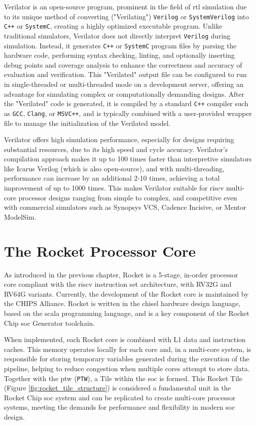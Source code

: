 Verilator is an open-source program, prominent in the field of \acrshort{rtl} simulation due to its unique method of converting ("Verilating") \texttt{Verilog} or \texttt{SystemVerilog} into \texttt{C++} or \texttt{SystemC}, creating a highly optimized executable program. Unlike traditional simulators, Verilator does not directly interpret \texttt{Verilog} during simulation. Instead, it generates \texttt{C++} or \texttt{SystemC} program files by parsing the hardware code, performing syntax checking, linting, and optionally inserting debug points and coverage analysis to enhance the correctness and accuracy of evaluation and verification. This "Verilated" output file can be configured to run in single-threaded or multi-threaded mode on a development server, offering an advantage for simulating complex or computationally demanding designs. After the "Verilated" code is generated, it is compiled by a standard \texttt{C++} compiler such as \texttt{GCC}, \texttt{Clang}, or \texttt{MSVC++}, and is typically combined with a user-provided wrapper file to manage the initialization of the Verilated model.

Verilator offers high simulation performance, especially for designs requiring substantial resources, due to its high speed and cycle accuracy. Verilator's compilation approach makes it up to 100 times faster than interpretive simulators like Icarus Verilog (which is also open-source), and with multi-threading, performance can increase by an additional 2-10 times, achieving a total improvement of up to 1000 times. This makes Verilator suitable for \acrshort{riscv} multi-core processor designs ranging from simple to complex, and competitive even with commercial simulators such as Synopsys VCS, Cadence Incisive, or Mentor ModelSim.

\section{The Rocket Processor Core}
\label{sec:rocket_core}

As introduced in the previous chapter, Rocket is a 5-stage, in-order processor core compliant with the \acrshort{riscv} instruction set architecture, with RV32G and RV64G variants. Currently, the development of the Rocket core is maintained by the CHIPS Alliance. Rocket is written in the \acrshort{chisel} hardware design language, based on the \acrshort{scala} programming language, and is a key component of the Rocket Chip \acrshort{soc} Generator toolchain.

When implemented, each Rocket core is combined with L1 data and instruction caches. This memory operates locally for each core and, in a multi-core system, is responsible for storing temporary variables generated during the execution of the pipeline, helping to reduce congestion when multiple cores attempt to store data. Together with the \acrlong{ptw} (\texttt{PTW}), a Tile within the \acrshort{soc} is formed. This Rocket Tile (Figure \ref{fig:rocket_tile_structure}) is considered a fundamental unit in the Rocket Chip \acrshort{soc} system and can be replicated to create multi-core processor systems, meeting the demands for performance and flexibility in modern \acrshort{soc} design.

